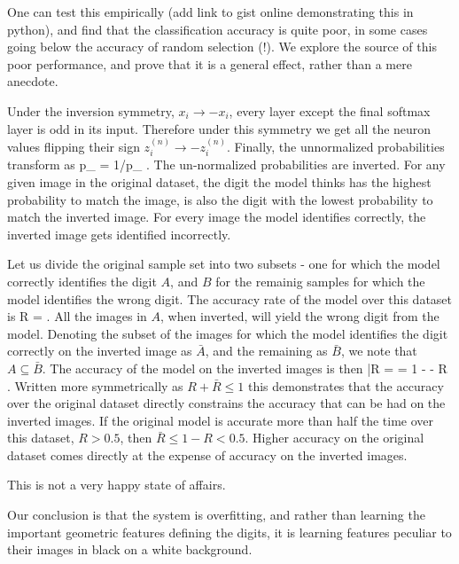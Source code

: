 \documentclass[twocolumn, prl]{revtex4-1}
\begin{document}
One can test this empirically (add link to gist online demonstrating this in python), and find that the classification accuracy is quite poor, in some cases going below the accuracy of random selection (!). We explore the source of this poor performance, and prove that it is a general effect, rather than a mere anecdote.

Under the inversion symmetry, $x_i \rightarrow - x_i$, every layer except the final softmax layer is odd in its 
input. Therefore under this symmetry we get all the neuron values flipping their sign $z^{(n)}_i \rightarrow - z^{(n)}_i$. Finally, the unnormalized probabilities transform as
\be
{\tilde p}_{\alpha} \rightarrow \exp{} = 1/{\tilde p}_{\alpha}
\; .
\ee
The un-normalized probabilities are inverted. For any given image in the original dataset, the digit the model thinks has the highest probability to match the image, is also the digit with the lowest probability to match the inverted image. For every image the model identifies correctly, the inverted image
gets identified incorrectly.

Let us divide the original sample set into two subsets - one for which the model correctly identifies the digit $A$, and $B$ for the remainig samples for which the model identifies the wrong digit. The accuracy rate of the model over this dataset is 
\be
R = 
\; .
\ee
All the images in $A$, when inverted, will yield the wrong digit from the model. Denoting the subset of the images for which the model identifies the digit correctly on the inverted image as ${\bar A}$, and the remaining as ${\bar B}$, we note that $A \subseteq {\bar B}$. The accuracy of the model on the inverted images is then
\be
{\bar R} =  = 1 -   - R
\; .
\ee
Written more symmetrically as $R + {\bar R} \leq 1$ this demonstrates that the accuracy over the original dataset directly constrains the accuracy that can be had on the inverted images. If the original model is accurate more than half the time over this dataset, $R>0.5$, then ${\bar R} \leq 1 - R < 0.5$. Higher accuracy on the original dataset comes directly at the expense of accuracy on the inverted images. 

This is not a very happy state of affairs. 

Our conclusion is that the system is overfitting, and rather than learning the important geometric features defining the digits, it is learning features peculiar to their images in black on a white background.
\end{document}
